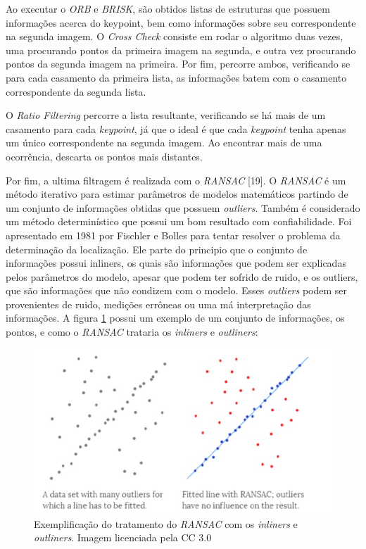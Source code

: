Ao executar o \textit{ORB} e \textit{BRISK}, são obtidos listas de estruturas que possuem informações acerca do keypoint, bem como informações sobre seu correspondente na segunda imagem. O \textit{Cross Check} consiste em rodar o algoritmo duas vezes, uma procurando pontos da primeira imagem na segunda, e outra vez procurando pontos da segunda imagem na primeira. Por fim, percorre ambos, verificando se para cada casamento da primeira lista, as informações batem com o casamento correspondente da segunda lista.

O \textit{Ratio Filtering} percorre a lista resultante, verificando se há mais de um casamento para cada \textit{keypoint}, já que o ideal é que cada \textit{keypoint} tenha apenas um único correspondente na segunda imagem. Ao encontrar mais de uma ocorrência, descarta os pontos mais distantes.

Por fim, a ultima filtragem é realizada com o \textit{RANSAC} [19]. O \textit{RANSAC} é um método iterativo para estimar parâmetros de modelos matemáticos partindo de um conjunto de informações obtidas que possuem \textit{outliers}. Também é considerado um método determinístico que possui um bom resultado com confiabilidade. Foi apresentado em 1981 por Fischler e Bolles para tentar resolver o problema da determinação da localização. Ele parte do principio que o conjunto de informações possui inliners, os quais são informações que podem ser explicadas pelos parâmetros do modelo, apesar que podem ter sofrido de ruido, e os outliers, que são informações que não condizem com o modelo. Esses \textit{outliers} podem ser provenientes de ruido, medições errôneas ou uma má interpretação das informações. A figura \ref{fig3:1} possui um exemplo de um conjunto de informações, os pontos, e como o \textit{RANSAC} trataria os \textit{inliners} e \textit{outliners}:

\begin{figure}
	\centering
		\includegraphics{Imagens/figura3-1.jpg}
	\caption{Exemplificação do tratamento do \textit{RANSAC} com os \textit{inliners} e \textit{outliners}. Imagem licenciada pela CC 3.0}
	\label{fig3:1}
\end{figure}
  

